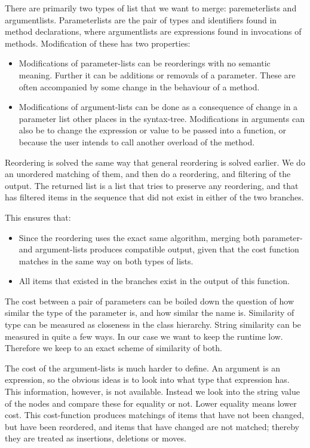 \documentclass[11pt]{article}
\begin{document}
There are primarily two types of list that we want to merge: paremeterlists and argumentlists. Parameterlists are the pair of types and identifiers found in method declarations, where argumentlists are expressions found in invocations of methods. Modification of these has two properties:

\begin{itemize}
   \item Modifications of parameter-lists can be reorderings with no semantic meaning. Further it can be additions or removals of a parameter. These are often accompanied by some change in the behaviour of a method.
   \item Modifications of argument-lists can be done as a consequence of change in a parameter list other places in the syntax-tree. Modifications in arguments can also be to change the expression or value to be passed into a function, or because the user intends to call another overload of the method.
\end{itemize}

Reordering is solved the same way that general reordering is solved earlier. We do an unordered matching of them, and then do a reordering, and filtering of the output. The returned list is a list that tries to preserve any reordering, and that has filtered items in the sequence that did not exist in either of the two branches.

This ensures that:

\begin{itemize}
   \item Since the reordering uses the exact same algorithm, merging both parameter- and argument-lists produces compatible output, given that the cost function matches in the same way on both types of lists.
   \item All items that existed in the branches exist in the output of this function. 
\end{itemize}

The cost between a pair of parameters can be boiled down the question of how similar the type of the parameter is, and how similar the name is. Similarity of type can be measured as closeness in the class hierarchy. String similarity can be measured in quite a few ways. In our case we want to keep the runtime low. Therefore we keep to an exact scheme of similarity of both.

The cost of the argument-lists is much harder to define. An argument is an expression, so the obvious ideas is to look into what type that expression has. This information, however, is not available. Instead we look into the string value of the nodes and compare these for equality or not. Lower equality means lower cost. This cost-function produces matchings of items that have not been changed, but have been reordered, and items that have changed are not matched; thereby they are treated as insertions, deletions or moves.
\end{document}
